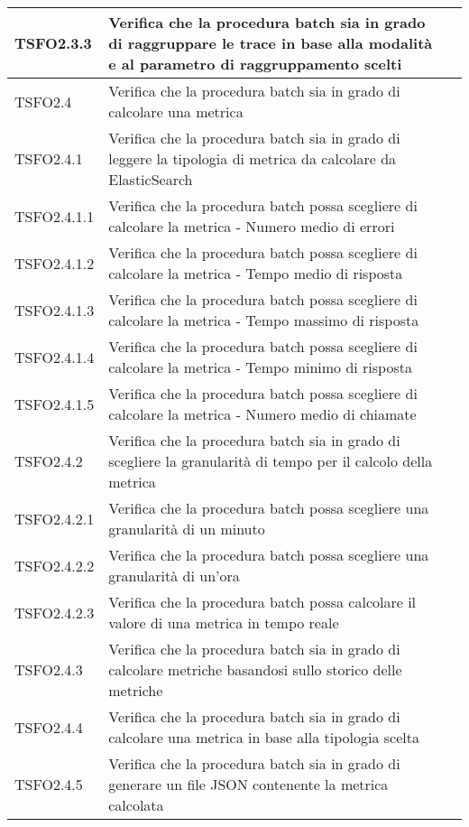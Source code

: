 \begin{center}
\begin{longtable}{ | >{\centering\arraybackslash}m{2.5cm} | >{\raggedright\arraybackslash}m{9cm} | >{\centering\arraybackslash}m{3.5cm} | }
				TSFO2.3.3 & Verifica che la procedura batch sia in grado di raggruppare le trace
							in base alla modalità e al parametro di raggruppamento scelti
						& \donetext{} \\ \hline
				TSFO2.4 & Verifica che la procedura batch sia in grado di calcolare una metrica 
						& \donetext{} \\ \hline
				TSFO2.4.1 & Verifica che la procedura batch sia in grado di leggere la tipologia di 
							metrica da calcolare da ElasticSearch 
						& \donetext{} \\ \hline
				TSFO2.4.1.1 & Verifica che la procedura batch possa scegliere di calcolare la metrica - Numero medio di errori
 & \donetext{} \\ \hline
				TSFO2.4.1.2 & Verifica che la procedura batch possa scegliere di calcolare la metrica - Tempo medio di risposta
 & \donetext{} \\ \hline
				TSFO2.4.1.3 & Verifica che la procedura batch possa scegliere di calcolare la metrica - Tempo massimo di risposta
 & \donetext{} \\ \hline
				TSFO2.4.1.4 & Verifica che la procedura batch possa scegliere di calcolare la metrica - Tempo minimo di risposta
 & \donetext{} \\ \hline
				TSFO2.4.1.5 & Verifica che la procedura batch possa scegliere di calcolare la metrica - Numero medio di chiamate
 & \donetext{} \\ \hline
				TSFO2.4.2 & Verifica che la procedura batch sia in grado di scegliere la granularità
							di tempo per il calcolo della metrica 
						& \donetext{} \\ \hline
				TSFO2.4.2.1 & Verifica che la procedura batch possa scegliere una granularità di un minuto & \donetext{} \\ \hline
				TSFO2.4.2.2 & Verifica che la procedura batch possa scegliere una granularità di un'ora & \donetext{} \\ \hline
				TSFO2.4.2.3 & Verifica che la procedura batch possa calcolare il valore di una metrica in tempo reale & \donetext{} \\ \hline
				TSFO2.4.3 & Verifica che la procedura batch sia in grado di calcolare metriche basandosi sullo
							storico delle metriche
						& \donetext{} \\ \hline
				TSFO2.4.4 & Verifica che la procedura batch sia in grado di calcolare una metrica in base alla tipologia scelta & \donetext{} \\ \hline
				TSFO2.4.5 & Verifica che la procedura batch sia in grado di generare un file JSON contenente la metrica calcolata & \donetext{} \\ \hline

\end{longtable}
\end{center}
